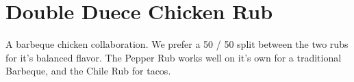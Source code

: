 \section[Double Duece]{Double Duece Chicken Rub}\label{double_duece_rub}


\begin{recipestats}[
	servings=1~\pound,
	preptime=10~\minute,
	original=Kevin \& Mike,
]
\end{recipestats}


\begin{recipeabstract}
	A barbeque chicken collaboration.
	We prefer a 50 / 50 split between the two rubs for it's balanced flavor.
	The Pepper Rub works well on it's own for a traditional Barbeque, and the Chile Rub for tacos.
\end{recipeabstract}


\begin{ingredientcolumns}
	\begin{ingredientblock}
		\\
		\\
		\\
		\\
		\\
	\end{ingredientblock}
	\vfill\null
	\columnbreak

	\begin{ingredientblock}
		\\
		\\
		\\
		\\
		\\
		\\
		\\
	\end{ingredientblock}
\end{ingredientcolumns}


